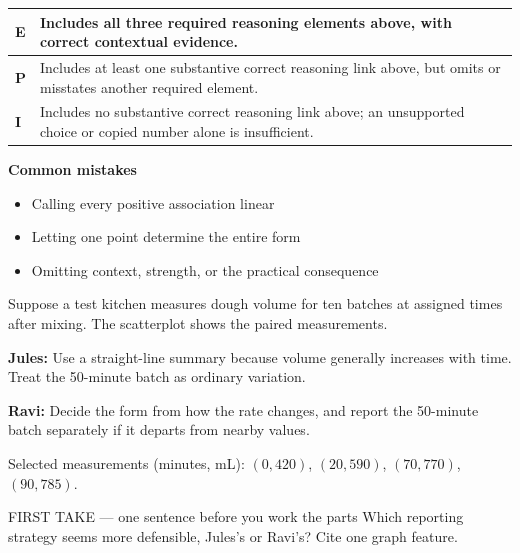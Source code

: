 \documentclass[11pt]{article}
\begin{document}
{\small\renewcommand{\arraystretch}{1.25}
\noindent\begin{tabular}{|p{0.5in}|p{5.9in}|}
\hline
\textbf{E} & Includes all three required reasoning elements above, with correct contextual evidence. \\ \hline
\textbf{P} & Includes at least one substantive correct reasoning link above, but omits or misstates another required element. \\ \hline
\textbf{I} & Includes no substantive correct reasoning link above; an unsupported choice or copied number alone is insufficient. \\ \hline
\end{tabular}}

\textbf{Common mistakes}
\begin{itemize}[leftmargin=1.5em,itemsep=2pt,topsep=2pt]
  \item Calling every positive association linear
  \item Letting one point determine the entire form
  \item Omitting context, strength, or the practical consequence
\end{itemize}

\clearpage
{}

Suppose a test kitchen measures dough volume for ten batches at assigned times after mixing. The scatterplot shows the paired measurements.\par\smallskip \textbf{Jules:} Use a straight-line summary because volume generally increases with time. Treat the 50-minute batch as ordinary variation.\par \textbf{Ravi:} Decide the form from how the rate changes, and report the 50-minute batch separately if it departs from nearby values.\par Selected measurements (minutes, mL): $(0,420)$, $(20,590)$, $(70,770)$, $(90,785)$.\par
\begin{center}
\end{center}
\begin{firsttakebox}{FIRST TAKE --- one sentence before you work the parts}
Which reporting strategy seems more defensible, Jules's or Ravi's? Cite one graph feature.\par
{}
\end{firsttakebox}
\end{document}

